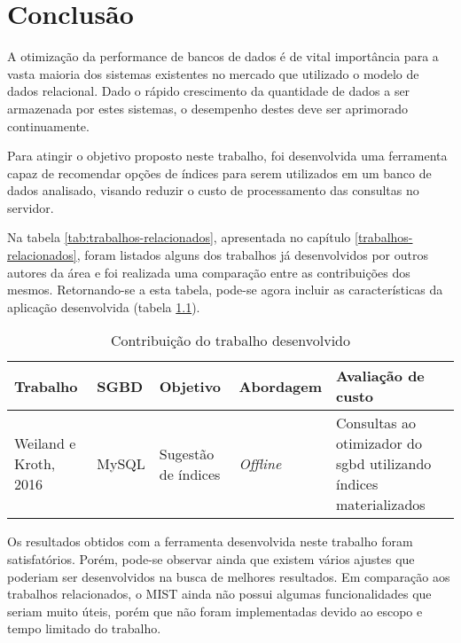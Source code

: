 \chapter{Conclusão}
\label{conclusao}

A otimização da performance de bancos de dados é de vital importância para a vasta maioria dos sistemas existentes no mercado que utilizado o modelo de dados relacional. Dado o rápido crescimento da quantidade de dados a ser armazenada por estes sistemas, o desempenho destes deve ser aprimorado continuamente.

Para atingir o objetivo proposto neste trabalho, foi desenvolvida uma ferramenta capaz de recomendar opções de índices para serem utilizados em um banco de dados analisado, visando reduzir o custo de processamento das consultas no servidor.

Na tabela \ref{tab:trabalhos-relacionados}, apresentada no capítulo \ref{trabalhos-relacionados}, foram listados alguns dos trabalhos já desenvolvidos por outros autores da área e foi realizada uma comparação entre as contribuições dos mesmos. Retornando-se a esta tabela, pode-se agora incluir as características da aplicação desenvolvida (tabela \ref{tab:contribuicao-trabalho}).

\begin{table}[H]
  \centering
  \caption{Contribuição do trabalho desenvolvido}
  \begin{tabular}{|p{2.1cm}|l|p{3.4cm}|p{2.1cm}|p{4.1cm}|} \hline
    \textbf{Trabalho}
        & \textbf{SGBD}
        & \textbf{Objetivo}
        & \textbf{Abordagem}
        & \textbf{Avaliação de custo}
        \\ \hline

    Weiland e Kroth, 2016
        & MySQL
        & Sugestão de índices
        & \emph{Offline}
        & Consultas ao otimizador do \gls{sgbd} utilizando índices materializados
        \\ \hline
  \end{tabular}
  \label{tab:contribuicao-trabalho}
\end{table}

Os resultados obtidos com a ferramenta desenvolvida neste trabalho foram satisfatórios. Porém, pode-se observar ainda que existem vários ajustes que poderiam ser desenvolvidos na busca de melhores resultados. Em comparação aos trabalhos relacionados, o MIST ainda não possui algumas funcionalidades que seriam muito úteis, porém que não foram implementadas devido ao escopo e tempo limitado do trabalho.


